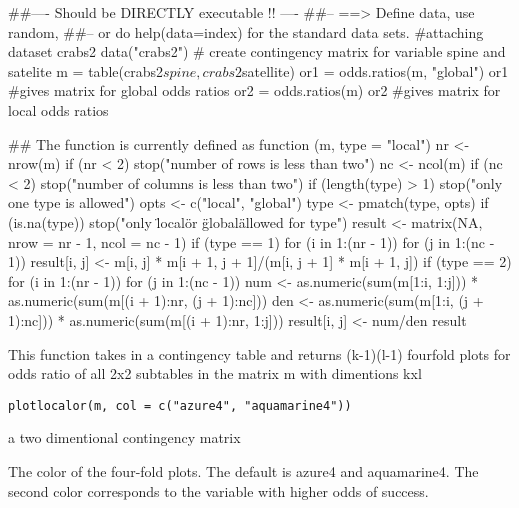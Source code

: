\documentclass[letterpaper]{book}
\begin{document}
\begin{Examples}
\begin{ExampleCode}
##---- Should be DIRECTLY executable !! ----
##-- ==>  Define data, use random,
##--	or do  help(data=index)  for the standard data sets.
 #attaching dataset crabs2
 data("crabs2")
 # create contingency matrix for variable spine and satelite 
 m = table(crabs2$spine, crabs2$satellite)
 or1 = odds.ratios(m, "global")
 or1 #gives matrix for global odds ratios
 or2 = odds.ratios(m)
 or2 #gives matrix for local odds ratios

## The function is currently defined as
function (m, type = "local") 
{
    nr <- nrow(m)
    if (nr < 2) 
        stop("number of rows is less than two")
    nc <- ncol(m)
    if (nc < 2) 
        stop("number of columns is less than two")
    if (length(type) > 1) 
        stop("only one type is allowed")
    opts <- c("local", "global")
    type <- pmatch(type, opts)
    if (is.na(type)) 
        stop("only \"local\" or \"global\" allowed for type")
    result <- matrix(NA, nrow = nr - 1, ncol = nc - 1)
    if (type == 1) 
        for (i in 1:(nr - 1)) for (j in 1:(nc - 1)) result[i, 
            j] <- m[i, j] * m[i + 1, j + 1]/(m[i, j + 1] * m[i + 
            1, j])
    if (type == 2) 
        for (i in 1:(nr - 1)) for (j in 1:(nc - 1)) {
            num <- as.numeric(sum(m[1:i, 1:j])) * as.numeric(sum(m[(i + 
                1):nr, (j + 1):nc]))
            den <- as.numeric(sum(m[1:i, (j + 1):nc])) * as.numeric(sum(m[(i + 
                1):nr, 1:j]))
            result[i, j] <- num/den
        }
    result
  }
\end{ExampleCode}
\end{Examples}
%
\begin{Description}\relax
This function takes in a contingency table and returns (k-1)(l-1) fourfold plots for odds ratio of all 2x2 subtables in the matrix 
m with dimentions kxl 
\end{Description}
%
\begin{Usage}
\begin{verbatim}
plotlocalor(m, col = c("azure4", "aquamarine4"))
\end{verbatim}
\end{Usage}
%
\begin{Arguments}
\begin{ldescription}
\item[\code{m}] 
a two dimentional contingency matrix

\item[\code{col}] 
The color of the four-fold plots. The default is azure4 and aquamarine4. The second color corresponds to the 
variable with higher odds of success.

\end{ldescription}
\end{Arguments}
\end{document}
